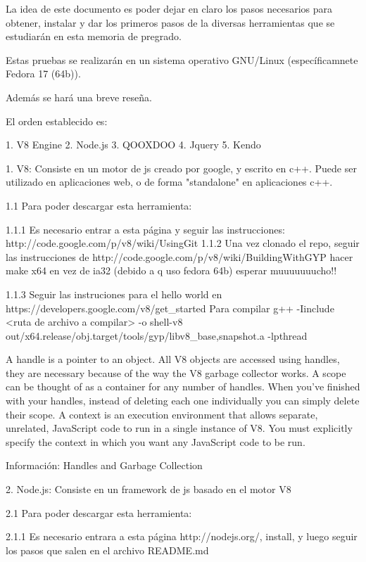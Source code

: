 La idea de este documento es poder dejar en claro los pasos necesarios para obtener,
instalar y dar los primeros pasos de la diversas herramientas que se estudiarán en esta 
memoria de pregrado.

Estas pruebas se realizarán en un sistema operativo GNU/Linux (específicamnete Fedora 17 (64b)).

Además se hará una breve reseña.

El orden establecido es:

  1. V8 Engine
  2. Node.js
  3. QOOXDOO
  4. Jquery
  5. Kendo



1. V8: Consiste en un motor de js creado por google, y escrito en c++. Puede ser utilizado 
   en aplicaciones web, o de forma "standalone" en aplicaciones c++.

   1.1 Para poder descargar esta herramienta:
   
   1.1.1 Es necesario entrar a esta página y seguir las instrucciones:
		http://code.google.com/p/v8/wiki/UsingGit
   1.1.2 Una vez clonado el repo, seguir las instrucciones de http://code.google.com/p/v8/wiki/BuildingWithGYP
	hacer make x64 en vez de ia32 (debido a q uso fedora 64b)
        esperar muuuuuuucho!!
     
   1.1.3 Seguir las instruciones para el hello world en https://developers.google.com/v8/get_started
Para compilar       
g++ -Iinclude <ruta de archivo a compilar> -o shell-v8 out/x64.release/obj.target/tools/gyp/libv8_{base,snapshot}.a -lpthread
 
    A handle is a pointer to an object. All V8 objects are accessed using handles, they are necessary because 
   of the way the V8 garbage collector works.
    A scope can be thought of as a container for any number of handles. When you've finished with your handles, 
   instead of deleting each one individually you can simply delete their scope.
    A context is an execution environment that allows separate, unrelated, JavaScript code to run in a single 
   instance of V8. You must explicitly specify the context in which you want any JavaScript code to be run.

 
   Información:
	Handles and Garbage Collection
	


2. Node.js: Consiste en un framework de js basado en el motor V8

  2.1 Para poder descargar esta herramienta:
 
  2.1.1 Es necesario entrara a esta página http://nodejs.org/, install, y luego seguir los pasos
        que salen en el archivo README.md

